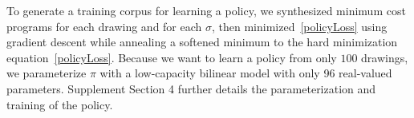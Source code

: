 \documentclass{article}
\theoremstyle{definition}
\begin{document}
To generate a training corpus for learning a policy,
we synthesized minimum cost programs for each  drawing
and for each $\sigma $,
then minimized~\ref{policyLoss} using gradient descent while annealing a softened minimum to the hard minimization equation~\ref{policyLoss}.
Because we want to learn a policy from only $100$ drawings,
we parameterize $\pi$ with a  low-capacity bilinear model with only 96 real-valued parameters. Supplement Section 4 further details the parameterization and training of the policy.
\end{document}
